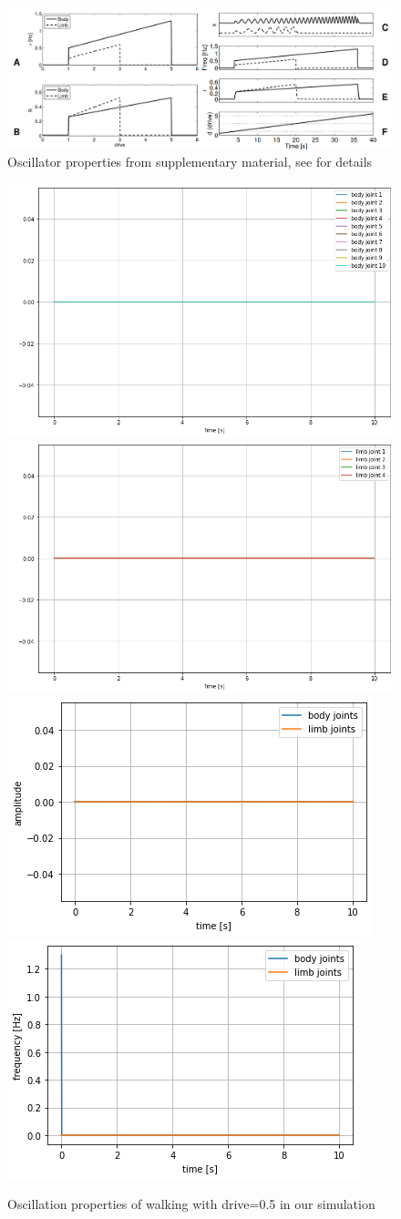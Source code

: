 \documentclass{cmc}
\begin{document}
\begin{figure}[H]
  \centering
  \includegraphics[width=1.0\textwidth]{figures/science_oscillator_properties}
  \caption{Oscillator properties from \cite{ijspeert2007swimming} supplementary
    material, see \cite{ijspeert2007swimming} for details}
  \label{fig:science_oscillator_properties}
\end{figure}


\begin{figure}[H]
\centering
\includegraphics[height=0.3\columnwidth]{figures/8a_d05_spine.png}
\includegraphics[height=0.3\columnwidth]{figures/8a_d05_limb.png}
\includegraphics[height=0.3\columnwidth]{figures/8a_d05_amp.png}
\includegraphics[height=0.3\columnwidth]{figures/8a_d05_freq.png}
\caption{Oscillation properties of walking with drive=0.5 in our simulation}
\label{a0}
\end{figure}
\end{document}
